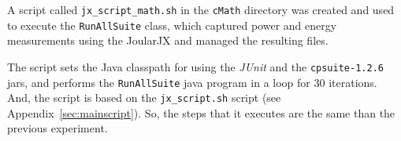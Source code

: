 \vspace{.5em}
A script called \texttt{jx\_script\_math.sh} in the \texttt{cMath} directory was created and used to execute the \texttt{RunAllSuite} class, which captured power and energy measurements using the JoularJX and managed the resulting files. 



\vspace{.5em}
The script sets the Java classpath for using the \textit{JUnit} and the \texttt{cpsuite-1.2.6} jars,  and performs the \texttt{RunAllSuite} java program in a loop for 30 iterations.
%
And, the script is based on the \texttt{jx\_script.sh} script (see Appendix~\ref{sec:mainscript}). So, the steps that it executes are the same than the previous experiment.



